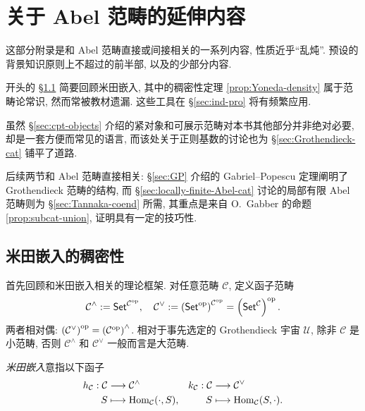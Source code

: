 

\chapter{关于 Abel 范畴的延伸内容}\label{sec:app-Abel}
这部分附录是和 Abel 范畴直接或间接相关的一系列内容, 性质近乎``乱炖''. 预设的背景知识原则上不超过的前半部, 以及的少部分内容.

开头的 \S\ref{sec:Yoneda} 简要回顾米田嵌入, 其中的稠密性定理 \ref{prop:Yoneda-density} 属于范畴论常识, 然而常被教材遗漏. 这些工具在 \S\ref{sec:ind-pro} 将有频繁应用.

虽然 \S\ref{sec:cpt-objects} 介绍的紧对象和可展示范畴对本书其他部分并非绝对必要, 却是一套方便而常见的语言, 而该处关于正则基数的讨论也为 \S\ref{sec:Grothendieck-cat} 铺平了道路.

后续两节和 Abel 范畴直接相关: \S\ref{sec:GP} 介绍的 Gabriel--Popescu 定理阐明了 Grothendieck 范畴的结构, 而 \S\ref{sec:locally-finite-Abel-cat} 讨论的局部有限 Abel 范畴则为 \S\ref{sec:Tannaka-coend} 所需, 其重点是来自 O.\ Gabber 的命题 \ref{prop:subcat-union}, 证明具有一定的技巧性.

\section{米田嵌入的稠密性}\label{sec:Yoneda}
首先回顾和米田嵌入相关的理论框架. 对任意范畴 $\mathcal{C}$, 定义函子范畴
\[ \mathcal{C}^\wedge := \mathsf{Set}^{\mathcal{C}^{\operatorname{op}}}, \quad \mathcal{C}^\vee := \left(\mathsf{Set}^{\operatorname{op}}\right)^{\mathcal{C}^{\operatorname{op}}} = \left( \mathsf{Set}^{\mathcal{C}} \right)^{\operatorname{op}}. \]
两者相对偶: $\left(\mathcal{C}^\vee \right)^{\operatorname{op}} = \left(\mathcal{C}^{\operatorname{op}}\right)^\wedge$. 相对于事先选定的 Grothendieck 宇宙 $\mathcal{U}$, 除非 $\mathcal{C}$ 是小范畴, 否则 $\mathcal{C}^\wedge$ 和 $\mathcal{C}^\vee$ 一般而言是大范畴. 

\emph{米田嵌入}意指以下函子
\begin{align*}
	h_{\mathcal{C}}: \mathcal{C} & \longrightarrow \mathcal{C}^\wedge & k_{\mathcal{C}}: \mathcal{C} & \longrightarrow \mathcal{C}^\vee \\
	S & \longmapsto \operatorname{Hom}_{\mathcal{C}}(\cdot, S), & S & \longmapsto \operatorname{Hom}_{\mathcal{C}}(S, \cdot).
\end{align*}

